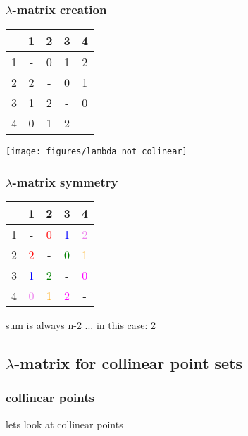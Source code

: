 \documentclass{beamer}
\begin{document}
% 
 \begin{frame}
 \frametitle{$\lambda$-matrix creation}
 \begin{tabular}{| c || c | c | c | c |}
     & 1 & 2 & 3 & 4 \\
  \hline
   1 & - & 0 & 1 & 2 \\
   2 & 2 & - & 0 & 1 \\
   3 & 1 & 2 & - & 0 \\
   4 & 0 & 1 & 2 & - \\
 \end{tabular}
 \begin{minipage}{0.5\textwidth}
 \texttt{[image: figures/lambda\_not\_colinear]}
 \end{minipage}
 \end{frame}
% 
\begin{frame}

\frametitle{$\lambda$-matrix symmetry}
\begin{center}
\begin{tabular}{| c || c | c | c | c |}
    & 1 & 2 & 3 & 4 \\
 \hline
  1 & - & \textcolor{red}{0} & \textcolor{blue}{1} & \textcolor{violet}{2} \\
  2 & \textcolor{red}{2} & - & \textcolor{green}{0} & \textcolor{orange}{1} \\
  3 & \textcolor{blue}{1} & \textcolor{green}{2} & - & \textcolor{magenta}{0} \\
  4 & \textcolor{violet}{0} & \textcolor{orange}{1} & \textcolor{magenta}{2} & - \\
\end{tabular}
\end{center}
\vspace{3em}
sum is always n-2 ... in this case: 2
\end{frame}
% 
\begin{frame}
\section{$\lambda$-matrix for collinear point sets}
\frametitle{collinear points}

lets look at collinear points
\end{frame}
\end{document}
